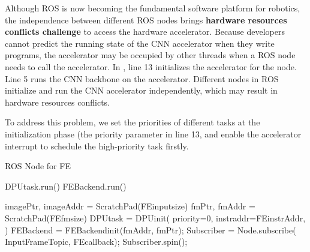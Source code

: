 Although ROS is now becoming the fundamental software platform for robotics, the independence between different ROS nodes brings \textbf{hardware resources conflicts challenge} to access the hardware accelerator. 
Because developers cannot predict the running state of the CNN accelerator when they write programs, the accelerator may be occupied by other threads when a ROS node needs to call the accelerator. In , line 13 initializes the accelerator for the node. Line 5 runs the CNN backbone on the accelerator. Different nodes in ROS initialize and run the CNN accelerator independently, which may result in hardware resources conflicts.

To address this problem, we set the priorities of different tasks at the initialization phase (the {\color{red}priority} parameter in   line 13, and enable the accelerator interrupt to schedule the high-priority task firstly.



\begin{algorithm}[t]
    \caption{ ROS Node for FE }
    \label{code:FE}
    \begin{algorithmic}[1]
        \State DPUtask.run()
        \State FEBackend.run()
        \EndFunction

        \State imagePtr, imageAddr = ScratchPad(FEinputsize)
        \State fmPtr, fmAddr = ScratchPad(FEfmsize)
        \State DPUtask = DPUinit({\color{red}  priority=0},{\color{blue} instraddr=FEinstrAddr, }
        \State \qquad \qquad \qquad {} ) 
        \State FEBackend = FEBackendinit({\color{blue}fmAddr, fmPtr});
        \State Subscriber = Node.subscribe( InputFrameTopic, FEcallback);
        \State Subscriber.spin();
        \EndFunction
    \end{algorithmic}
\end{algorithm}

